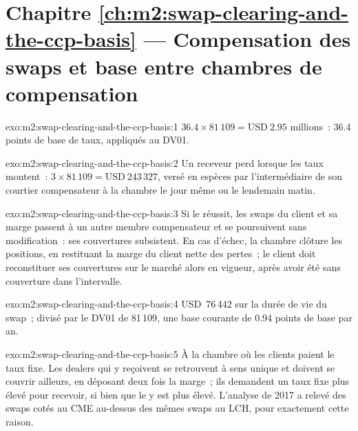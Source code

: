 \section*{Chapitre \ref{ch:m2:swap-clearing-and-the-ccp-basis} --- Compensation des swaps et base entre chambres de compensation}

\begin{solution}{exo:m2:swap-clearing-and-the-ccp-basis:1}
$36.4 \times 81\,109 = \text{USD}~2.95$ millions~: 36.4 points de base de taux, appliqués
au DV01.
\end{solution}

\begin{solution}{exo:m2:swap-clearing-and-the-ccp-basis:2}
Un receveur perd lorsque les taux montent~: $3 \times 81\,109 = \text{USD}~243\,327$, versé en espèces
par l'intermédiaire de son courtier compensateur à la chambre le jour même ou le lendemain matin.
\end{solution}

\begin{solution}{exo:m2:swap-clearing-and-the-ccp-basis:3}
Si le  réussit, les swaps du client et sa marge passent à un autre
membre compensateur et se poursuivent sans modification~: ses couvertures subsistent. En cas d'échec, la
chambre clôture les positions, en restituant la marge du client nette des pertes~;
le client doit reconstituer ses couvertures sur le marché alors en vigueur, après
avoir été sans couverture dans l'intervalle.
\end{solution}

\begin{solution}{exo:m2:swap-clearing-and-the-ccp-basis:4}
USD~76\,442 sur la durée de vie du swap~; divisé par le DV01 de 81\,109, une base
courante de 0.94 points de base par an.
\end{solution}

\begin{solution}{exo:m2:swap-clearing-and-the-ccp-basis:5}
À la chambre où les clients paient le taux fixe. Les dealers qui y reçoivent se retrouvent
à sens unique et doivent se couvrir ailleurs, en déposant deux fois la marge~; ils demandent un taux fixe plus élevé pour
recevoir, si bien que le  y est plus élevé. L'analyse de 2017 a relevé des swaps
cotés au CME au-dessus des mêmes swaps au LCH, pour exactement cette raison.
\end{solution}

